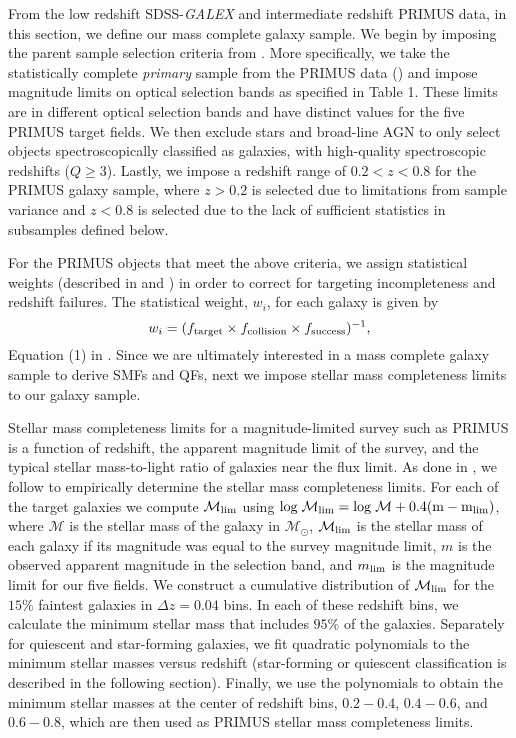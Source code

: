 \documentclass{emulateapj}
\begin{document}
From the low redshift SDSS-{\em GALEX} and intermediate redshift PRIMUS data, in this section, we define our mass complete galaxy sample. We begin by imposing the parent sample selection criteria from \cite{Moustakas:2013aa}. More specifically, we take the statistically complete {\em primary} sample from the PRIMUS data (\cite{Coil:2011aa}) and impose magnitude limits on optical selection bands as specified in \cite{Moustakas:2013aa} Table 1. These limits are in different optical selection bands and have distinct values for the five PRIMUS target fields. We then exclude stars and broad-line AGN to only select objects spectroscopically classified as galaxies, with high-quality spectroscopic redshifts ($Q \geq 3$). Lastly, we impose a redshift range of $ 0.2 < z < 0.8$ for the PRIMUS galaxy sample, where $ z > 0.2$ is selected due to limitations from sample variance and $ z < 0.8$ is selected due to the lack of sufficient statistics in subsamples defined below. 

For the PRIMUS objects that meet the above criteria, we assign statistical weights (described in \cite{Coil:2011aa} and \cite{Cool:2013aa}) in order to correct for targeting incompleteness and redshift failures. The statistical weight, $w_i$, for each galaxy is given by
\begin{equation}
w_{i} = (f_{\rm{target}} \times f_{\rm{collision}} \times f_{\rm{success}})^{-1},
\end{equation}
Equation (1) in \cite{Moustakas:2013aa}. Since we are ultimately interested in a mass complete galaxy sample to derive SMFs and QFs, next we impose stellar mass completeness limits to our galaxy sample. 

Stellar mass completeness limits for a magnitude-limited survey such as PRIMUS is a function of redshift, the apparent magnitude limit of the survey, and the typical stellar mass-to-light ratio of galaxies near the flux limit. As done in \cite{Moustakas:2013aa}, we follow \cite{Pozzetti:2010aa} to empirically determine the stellar mass completeness limits. For each of the target galaxies we compute $\mathcal{M}_{\rm{lim}}$ using $\rm{log} \; \mathcal{M}_{\rm{lim}} = \rm{log} \; \mathcal{M} + 0.4 ( m - m_{\rm{lim}})$, where $\mathcal{M}$ is the stellar mass of the galaxy in $\mathcal{M_{\odot}}$, $\mathcal{M}_{\rm{lim}}$ is the stellar mass of each galaxy if its magnitude was equal to the survey magnitude limit, $m$ is the observed apparent magnitude in the selection band, and $m_{\rm{lim}}$ is the magnitude limit for our five fields. We construct a cumulative distribution of $\mathcal{M}_{\rm{lim}}$ for the $15\%$ faintest galaxies in $\Delta z=0.04$ bins. In each of these redshift bins, we calculate the minimum stellar mass that includes $95 \%$ of the galaxies. Separately for quiescent and star-forming galaxies, we fit quadratic polynomials to the minimum stellar masses versus redshift (star-forming or quiescent classification is described in the following section). Finally, we use the polynomials to obtain the minimum stellar masses at the center of redshift bins, $0.2-0.4$, $0.4-0.6$, and $0.6-0.8$, which are then used as PRIMUS stellar mass completeness limits.
\end{document}
